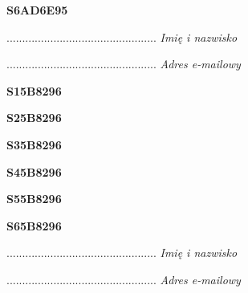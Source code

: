 \begin{turn}{90}\huge \textbf{S6AD6E95}\end{turn}

\begin{turn}{90}\begin{minipage}{\linewidth} \vspace{20mm} ................................................  \textit{Imię i nazwisko}\end{minipage}\end{turn}

\begin{turn}{90}\begin{minipage}{\linewidth} \vspace{20mm} ................................................  \textit{Adres e-mailowy}\end{minipage}\end{turn}

\begin{turn}{90}\huge \textbf{S15B8296}\end{turn}

\begin{turn}{90}\huge \textbf{S25B8296}\end{turn}

\begin{turn}{90}\huge \textbf{S35B8296}\end{turn}

\begin{turn}{90}\huge \textbf{S45B8296}\end{turn}

\begin{turn}{90}\huge \textbf{S55B8296}\end{turn}

\begin{turn}{90}\huge \textbf{S65B8296}\end{turn}

\begin{turn}{90}\begin{minipage}{\linewidth} \vspace{20mm} ................................................  \textit{Imię i nazwisko}\end{minipage}\end{turn}

\begin{turn}{90}\begin{minipage}{\linewidth} \vspace{20mm} ................................................  \textit{Adres e-mailowy}\end{minipage}\end{turn}

